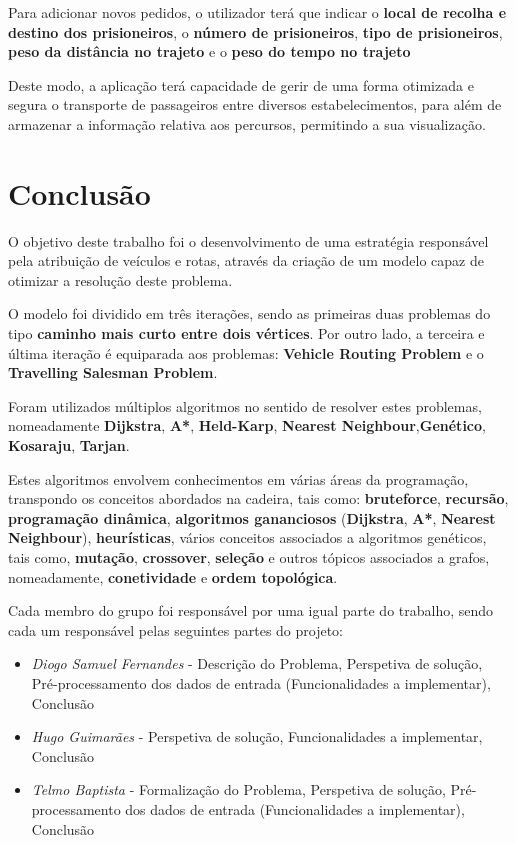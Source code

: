 \documentclass[article, a4paper, 12pt, oneside]{memoir}
\begin{document}
Para adicionar novos pedidos, o utilizador terá que indicar o \textbf{local de recolha e destino dos prisioneiros}, o \textbf{número de prisioneiros}, \textbf{tipo de prisioneiros}, \textbf{peso da distância no trajeto} e o \textbf{peso do tempo no trajeto}

Deste modo, a aplicação terá capacidade de gerir de uma forma otimizada e segura o transporte de passageiros entre diversos estabelecimentos, para além de armazenar a informação relativa aos percursos, permitindo a sua visualização.

\newpage
\chapter[Conclusão][Conclusão]{Conclusão} \label{\thechapter}

O objetivo deste trabalho foi o desenvolvimento de uma estratégia responsável pela atribuição de veículos e rotas, através da criação de um modelo capaz de otimizar a resolução deste problema.  

O modelo foi dividido em três iterações, sendo as primeiras duas problemas do tipo \textbf{caminho mais curto entre dois vértices}. Por outro lado, a terceira e última iteração é equiparada aos problemas: \textbf{Vehicle Routing Problem} e o \textbf{Travelling Salesman Problem}.  

Foram utilizados múltiplos algoritmos no sentido de resolver estes problemas, nomeadamente \textbf{Dijkstra}, \textbf{A*}, \textbf{Held-Karp}, \textbf{Nearest Neighbour},\textbf{Genético}, \textbf{Kosaraju}, \textbf{Tarjan}.

Estes algoritmos envolvem conhecimentos em várias áreas da programação, transpondo os conceitos abordados na cadeira, tais como: \textbf{bruteforce}, \textbf{recursão}, \textbf{programação dinâmica}, \textbf{algoritmos gananciosos} (\textbf{Dijkstra}, \textbf{A*}, \textbf{Nearest Neighbour}), \textbf{heurísticas}, vários conceitos associados a algoritmos genéticos, tais como, \textbf{mutação}, \textbf{crossover}, \textbf{seleção} e outros tópicos associados a grafos, nomeadamente, \textbf{conetividade} e  \textbf{ordem topológica}.

Cada membro do grupo foi responsável por uma igual parte do trabalho, sendo cada um responsável pelas seguintes partes do projeto:
\begin{itemize}
	\item\emph{ Diogo Samuel Fernandes} - Descrição do Problema, Perspetiva de solução, Pré-processamento dos dados de entrada (Funcionalidades a implementar),  Conclusão
	\item\emph{ Hugo Guimarães} -  Perspetiva de solução, Funcionalidades a implementar, Conclusão
	\item\emph{ Telmo Baptista} - Formalização do Problema, Perspetiva de solução, Pré-processamento dos dados de entrada (Funcionalidades a implementar),  Conclusão
\end{itemize}
\end{document}
